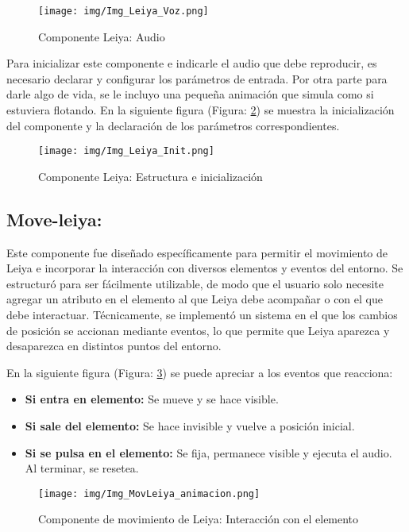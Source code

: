 \documentclass[a4paper, 12pt]{book}
\begin{document}
        \begin{figure}[H]
            \centering
            \texttt{[image: img/Img\_Leiya\_Voz.png]}
            \caption{Componente Leiya: Audio}
            \label{fig:Img_Leiya_Voz.png}
        \end{figure}

        Para inicializar este componente e indicarle el audio que debe reproducir, es necesario declarar y configurar los parámetros de entrada. Por otra parte para darle algo de vida, se le incluyo una pequeña animación que simula como si estuviera flotando. En la siguiente figura (Figura: \ref{fig:Img_Leiya_Init.png}) se muestra la inicialización del componente y la declaración de los parámetros correspondientes.

        \begin{figure}[H]
            \centering
            \texttt{[image: img/Img\_Leiya\_Init.png]}
            \caption{Componente Leiya: Estructura e inicialización}
            \label{fig:Img_Leiya_Init.png}
        \end{figure}


        \subsection{Move-leiya:}

        Este componente fue diseñado específicamente para permitir el movimiento de Leiya e incorporar la interacción con diversos elementos y eventos del entorno. Se estructuró para ser fácilmente utilizable, de modo que el usuario solo necesite agregar un atributo en el elemento al que Leiya debe acompañar o con el que debe interactuar. Técnicamente, se implementó un sistema en el que los cambios de posición se accionan mediante eventos, lo que permite que Leiya aparezca y desaparezca en distintos puntos del entorno.

        En la siguiente figura (Figura: \ref{fig:Img_MovLeiya_animacion}) se puede apreciar a los eventos que reacciona:
        \begin{itemize}
            \item \textbf{Si entra en elemento:} Se mueve y se hace visible.
            \item \textbf{Si sale del elemento:} Se hace invisible y vuelve a posición inicial.
            \item \textbf{Si se pulsa en el elemento:} Se fija, permanece visible y ejecuta el audio. Al terminar, se resetea.
        \end{itemize}
        \begin{figure}[H]
            \centering
            \texttt{[image: img/Img\_MovLeiya\_animacion.png]}
            \caption{Componente de movimiento de Leiya: Interacción con el elemento}
            \label{fig:Img_MovLeiya_animacion}
        \end{figure}
\end{document}
